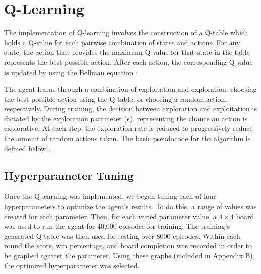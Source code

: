 \section{Q-Learning}
The implementation of Q-learning involves the construction of a Q-table which holds a Q-value for each pairwise combination of states and actions.
For any state, the action that provides the maximum Q-value for that state in the table represents the best possible action.
After each action, the corresponding Q-value is updated by using the Bellman equation \cite{mitchell}:



The agent learns through a combination of exploitation and exploration: choosing the best possible action using the Q-table, or choosing a random action, respectively.
During training, the decision between exploration and exploitation is dictated by the exploration parameter ($\epsilon$), representing the chance an action is explorative. 
At each step, the exploration rate is reduced to progressively reduce the amount of random actions taken.
The basic pseudocode for the algorithm is defined below \cite{mateo}.
\\



\subsection{Hyperparameter Tuning}
Once the Q-learning was implemented, we began tuning each of four hyperparameters to optimize the agent's results. To do this, a range of values was created for each parameter. Then, for each varied parameter value, a $4\times4$ board was used to run the agent for 40,000 episodes for training. The training’s generated Q-table was then used for testing over 8000 episodes. Within each round the score, win percentage, and board completion was recorded in order to be graphed against the parameter. Using these graphs (included in Appendix B), the optimized hyperparameter was selected. 

